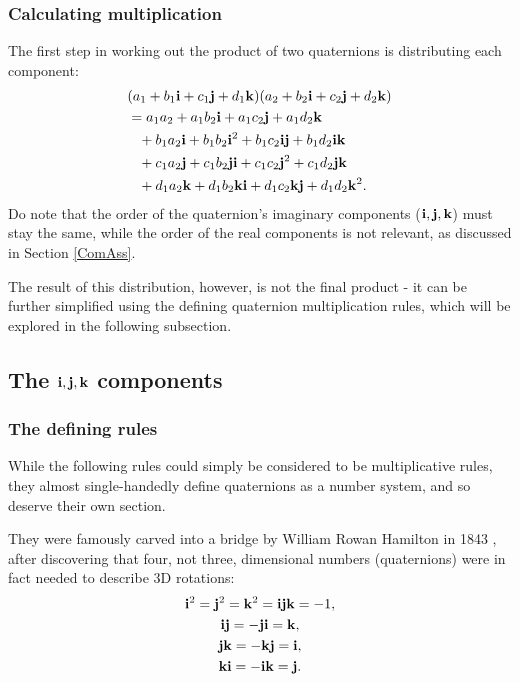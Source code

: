 \documentclass[11pt]{article}
\begin{document}
\subsubsection{Calculating multiplication} \label{InitialMult}

The first step in working out the product of two quaternions is distributing each component:
\begin{equation}
    \begin{aligned}
        & (a_1 + b_1\vb{i} + c_1\vb{j} + d_1\vb{k})(a_2 + b_2\vb{i} + c_2\vb{j} + d_2\vb{k}) \\
        & = a_1a_2 + a_1b_2\vb{i} + a_1c_2\vb{j} + a_1d_2\vb{k} \\
        & \phantom{=} + b_1a_2\vb{i} + b_1b_2\vb{i}^2 + b_1c_2\vb{i}\vb{j} + b_1d_2\vb{i}\vb{k} \\
        & \phantom{=} + c_1a_2\vb{j} + c_1b_2\vb{j}\vb{i} + c_1c_2\vb{j}^2 + c_1d_2\vb{j}\vb{k} \\
        & \phantom{=} + d_1a_2\vb{k} + d_1b_2\vb{k}\vb{i} + d_1c_2\vb{k}\vb{j} + d_1d_2\vb{k}^2.
    \end{aligned}
\end{equation}
Do note that the order of the quaternion's imaginary components ($\vb{i, j, k}$) must stay the same, while the order of the real components is not relevant, as discussed in Section \ref{ComAss}.

The result of this distribution, however, is not the final product - it can be further simplified using the defining quaternion multiplication rules, which will be explored in the following subsection.

\subsection{The $\vb{i, j, k}$ components}

\subsubsection{The defining rules}

While the following rules \cite{Eater} could simply be considered to be multiplicative rules, they almost single-handedly define quaternions as a number system, and so deserve their own section.

They were famously carved into a bridge by William Rowan Hamilton in 1843 \cite{QuaternionWiki}, after discovering that four, not three, dimensional numbers (quaternions) were in fact needed to describe 3D rotations:
\begin{subequations} \label{MultProperties1}
    \begin{gather}
        \vb{i}^2 = \vb{j}^2 = \vb{k}^2 = \vb{i}\vb{j}\vb{k} = -1, \\
        \vb{ij} = -\vb{ji} = \vb{k}, \\
        \vb{jk} = -\vb{kj} = \vb{i}, \\
        \vb{ki} = -\vb{ik} = \vb{j}.
    \end{gather}
\end{subequations}
\end{document}
